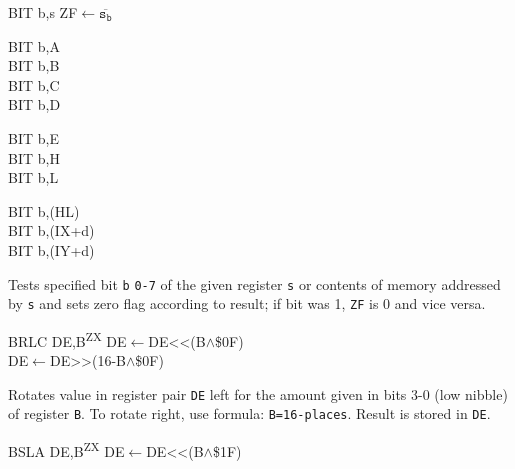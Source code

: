 \documentclass[12pt,twoside,openright,a4paper]{book}
\newcommand{\ZXN}{\textnormal{\textsuperscript{ZX}}}
\begin{document}
\begin{basedescript}{
	\desclabelstyle{\multilinelabel}
	\desclabelwidth{3cm}}
	\begin{detailitem}{BIT b,s}
		{ZF$\leftarrow\mathtt{\overline{s_b}}$}

		\begin{DetailVariants}
			BIT b,A\\
			BIT b,B\\
			BIT b,C\\
			BIT b,D

			\columnbreak
			BIT b,E\\
			BIT b,H\\
			BIT b,L
			
			\columnbreak
			BIT b,(HL)\\
			BIT b,(IX+d)\\
			BIT b,(IY+d)
		\end{DetailVariants}

		Tests specified bit {\tt b} {\tt 0-7} of the given register {\tt s} or contents of memory addressed by {\tt s} and sets zero flag according to result; if bit was 1, {\tt ZF} is 0 and vice versa.

		\begin{DetailEffects}
		\end{DetailEffects}

		\begin{DetailTiming}
		\end{DetailTiming}

	\end{detailitem}

	\begin{detailitem}{BRLC DE,B\ZXN}
		{DE$\leftarrow$DE<<(B$\wedge$\$0F)\\
		DE$\leftarrow$DE>>(16-B$\wedge$\$0F)}

		Rotates value in register pair {\tt DE} left for the amount given in bits 3-0 (low nibble) of register {\tt B}. To rotate right, use formula: {\tt B=16-places}. Result is stored in {\tt DE}.

		\DetailNoEffect

		\begin{DetailTiming}
			\DetailTime{}{2}{8}
		\end{DetailTiming}

	\end{detailitem}

	\begin{detailitem}{BSLA DE,B\ZXN}
		{DE$\leftarrow$DE<<(B$\wedge$\$1F)}


\end{detailitem}
\end{basedescript}
\end{document}
